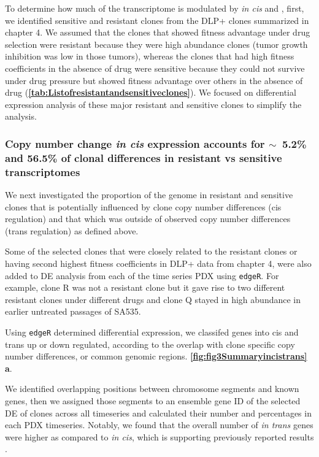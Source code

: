 To determine how much of the transcriptome is modulated by \textit{in cis} and , first, we identified sensitive and resistant clones from the DLP+ clones summarized in chapter 4. We assumed that the clones that showed fitness advantage under drug selection were resistant because they were high abundance clones (tumor growth inhibition was low in those tumors), whereas the clones that had high fitness coefficients in the absence of drug were sensitive because they could not survive under drug pressure but showed fitness advantage over others in the absence of drug (\textbf{\autoref{tab:Listofresistantandsensitiveclones}}). We focused on differential expression analysis of these major resistant and sensitive clones to simplify the analysis.

\subsubsection{Copy number change \textit{in cis} expression accounts for {$\sim${~}}5.2\% and 56.5\% of clonal differences in resistant vs sensitive transcriptomes}

We next investigated the proportion of the genome in resistant and sensitive clones that is potentially influenced by clone copy number differences (cis regulation) and that which was outside of observed copy number differences (trans regulation) as defined above.

Some of the selected clones that were closely related to the resistant clones or having second highest fitness coefficients in DLP+ data from chapter 4, were also added to DE analysis from each of the time series PDX using \texttt{edgeR}. For example, clone R was not a resistant clone but it gave rise to two different resistant clones under different drugs and clone Q stayed in high abundance in earlier untreated passages of SA535.

Using \texttt{edgeR} determined differential expression, we classifed genes into cis and trans up or down regulated, according to the overlap with clone specific copy number differences, or common genomic regions. \textbf{\autoref{fig:fig3Summaryincistrans} a}.

We identified overlapping positions between chromosome segments and known genes, then we assigned those segments to an ensemble gene ID \cite{rainer2019ensembldb} of the  selected \ac{DE} of clones across all timeseries and calculated their number and percentages in each PDX timeseries. Notably, we found that the overall number of \textit{in trans} genes were higher as compared to \textit{in cis}, which is supporting previously reported results \cite{shao2019copy}. 


